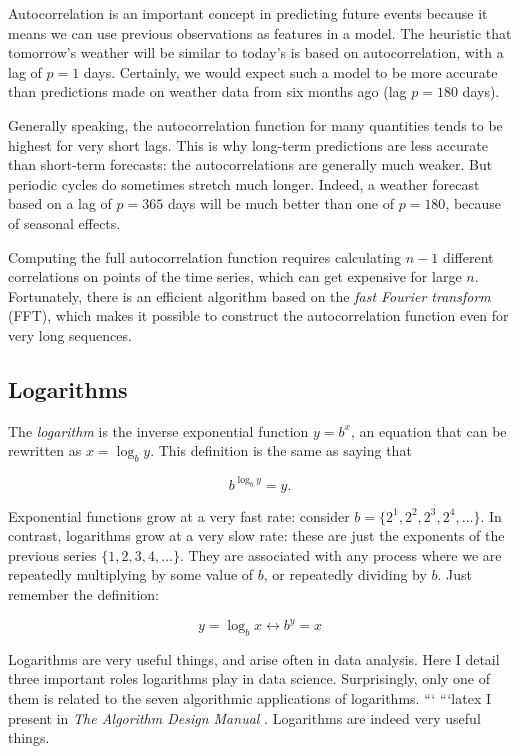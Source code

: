 \documentclass[10pt]{article}
\begin{document}
Autocorrelation is an important concept in predicting future events because it means we can use previous observations as features in a model. The heuristic that tomorrow's weather will be similar to today's is based on autocorrelation, with a lag of $p=1$ days. Certainly, we would expect such a model to be more accurate than predictions made on weather data from six months ago (lag $p=180$ days).

Generally speaking, the autocorrelation function for many quantities tends to be highest for very short lags. This is why long-term predictions are less accurate than short-term forecasts: the autocorrelations are generally much weaker. But periodic cycles do sometimes stretch much longer. Indeed, a weather forecast based on a lag of $p=365$ days will be much better than one of $p=180$, because of seasonal effects.

Computing the full autocorrelation function requires calculating $n-1$ different correlations on points of the time series, which can get expensive for large $n$. Fortunately, there is an efficient algorithm based on the \textit{fast Fourier transform} (FFT), which makes it possible to construct the autocorrelation function even for very long sequences.

\subsection{Logarithms}
The \textit{logarithm} is the inverse exponential function $y=b^{x}$, an equation that can be rewritten as $x=\log_{b} y$. This definition is the same as saying that

\[
b^{\log_{b} y}=y.
\]

Exponential functions grow at a very fast rate: consider $b=\{2^{1}, 2^{2}, 2^{3}, 2^{4}, \ldots\}$. In contrast, logarithms grow at a very slow rate: these are just the exponents of the previous series $\{1,2,3,4,\ldots\}$. They are associated with any process where we are repeatedly multiplying by some value of $b$, or repeatedly dividing by $b$. Just remember the definition:

\[
y=\log_{b} x \longleftrightarrow b^{y}=x
\]

Logarithms are very useful things, and arise often in data analysis. Here I detail three important roles logarithms play in data science. Surprisingly, only one of them is related to the seven algorithmic applications of logarithms.
```
```latex
I present in \textit{The Algorithm Design Manual} \cite{Ski08}. Logarithms are indeed very useful things.
\end{document}
